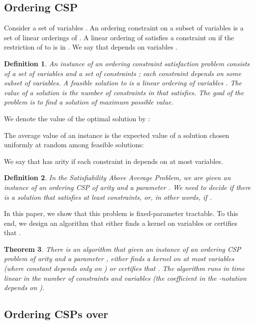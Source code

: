 \documentclass[11pt]{article}
\newtheorem{theorem}{Theorem}
\newtheorem{definition}[theorem]{Definition}
\begin{document}
\subsection{Ordering CSP}\label{sec:prelim-order-csp}
Consider a set of variables .
An ordering constraint  on
a subset of variables 
is a set of linear orderings of
.
A linear ordering  of   satisfies a constraint  on  if the restriction of  to
 is in .
We say that  depends on variables .
\begin{definition}
An instance  of an ordering constraint satisfaction problem consists of a set of variables  and a set of constraints ;
each constraint  depends on some subset of variables.
A feasible solution to  is a linear ordering of
variables . The value  of a solution  is the number of constraints in  that  satisfies. The goal of the problem is to find a solution of maximum possible value.
\end{definition}

We denote the value of the optimal solution by :

The average value  of an instance is the expected value of a solution chosen uniformly at random among  feasible solutions:

We say that  has arity  if each constraint
in  depends on at most  variables.

\begin{definition}
In the Satisfiability Above Average Problem,
we are given an instance of an ordering CSP of arity 
and a parameter . We need to decide if there is a solution  that satisfies at least  constraints, or, in other words, if .
\end{definition}

In this paper, we show that this problem is fixed-parameter tractable. To this end, we design an algorithm
that either finds a kernel on  variables or certifies that .
\begin{theorem}\label{thm:main}
There is an algorithm that given an instance of an
ordering CSP problem of arity  and a parameter ,
either finds a kernel on at most  variables
(where constant  depends only on )
or
certifies that .
The algorithm runs in time  linear in the number of constraints  and variables  (the coefficient in the -notation depends on ).	
\end{theorem}


\subsection{Ordering CSPs over }\label{sec:csp-over-product-space}
\end{document}
